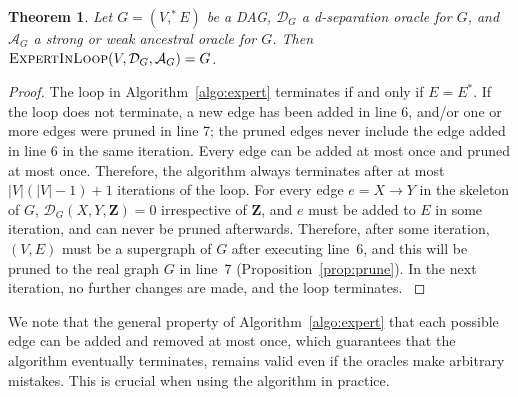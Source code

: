 \documentclass[accepted]{uai2025} %
\newtheorem{theorem}{Theorem}
\begin{document}
\begin{theorem}
Let $G=(V,^*E)$ be a DAG, $\mathcal{D}_G$ a d-separation oracle for $G$, and 
$\mathcal{A}_G$ a strong or weak ancestral oracle for $G$. Then 
$\textsc{ExpertInLoop}(V,\mathcal{D}_G,\mathcal{A}_G)=G$.
\end{theorem}

\begin{proof}
The loop in Algorithm~\ref{algo:expert} terminates if and 
only if $E=E^*$. If the loop does not  terminate, a new
 edge has been added in line 6, and/or one or more edges were 
pruned in line 7; the pruned edges never include the edge added 
in line 6 in the same iteration. Every edge can be added at 
most once and pruned at most once. Therefore, the algorithm 
always terminates after at most $|V|(|V|-1)+1$ iterations of
the loop. For every edge $e=X\to Y $ in the skeleton of $G$, 
$\mathcal{D}_G(X,Y,\mathbf{Z})=0$ irrespective of $\mathbf{Z}$, 
and $e$ must be added to $E$ in some iteration, and can never 
be pruned afterwards. Therefore, after some iteration, 
$(V,E)$ must be a supergraph of $G$ after executing line~6, 
and this will be pruned to the real graph $G$ in line~7 
(Proposition~\ref{prop:prune}). In the next iteration, 
no further changes are made, and the loop terminates.
\label{thm:itworks}
\end{proof} 

We note that the general property of Algorithm~\ref{algo:expert} that 
each possible edge can be added and removed at most once, which guarantees
that the algorithm eventually terminates, remains valid even if the oracles make
arbitrary mistakes. This is crucial when using the algorithm in practice.
\end{document}
